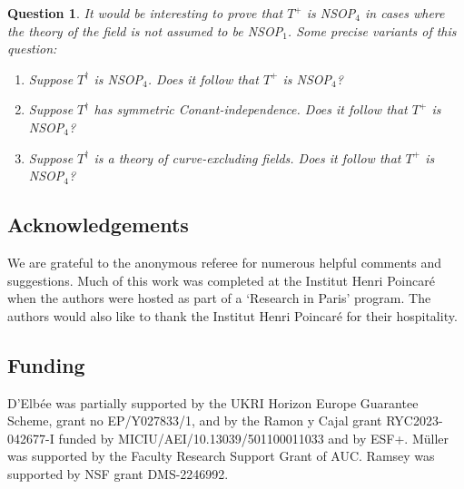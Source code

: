 \documentclass[psamsfonts]{amsart}
\newtheorem{quest}[thm]{Question}
\theoremstyle{definition}
\theoremstyle{definition}
\theoremstyle{remark}
\numberwithin{equation}{section}
\begin{document}
\begin{quest}
It would be interesting to prove that $T^{+}$ is NSOP$_{4}$ in cases where the theory of the field is \emph{not} assumed to be NSOP$_{1}$. Some precise variants of this question: 
    \begin{enumerate}
        \item Suppose $T^{\dagger}$ is NSOP$_{4}$.  Does it follow that $T^{+}$ is NSOP$_{4}$?
        \item Suppose $T^{\dagger}$ has symmetric Conant-independence. Does it follow that $T^{+}$ is NSOP$_{4}$?
        \item Suppose $T^{\dagger}$ is a theory of curve-excluding fields.  Does it follow that $T^{+}$ is NSOP$_{4}$?
    \end{enumerate}
\end{quest}


\subsection*{Acknowledgements}

We are grateful to the anonymous referee for numerous helpful comments and suggestions. Much of this work was completed at the Institut Henri Poincar\'e when the authors were hosted as part of a `Research in Paris' program. The authors would also like to thank the Institut Henri Poincar\'e for their hospitality.

\subsection*{Funding}

D'Elb\'ee was partially supported by the UKRI Horizon Europe Guarantee Scheme, grant no EP/Y027833/1, and by the Ramon y Cajal grant RYC2023-042677-I funded by MICIU/AEI/10.13039/501100011033 and by ESF+. M\"uller was supported by the Faculty Research Support Grant of AUC. Ramsey was supported by NSF grant DMS-2246992. 



{}
\end{document}
